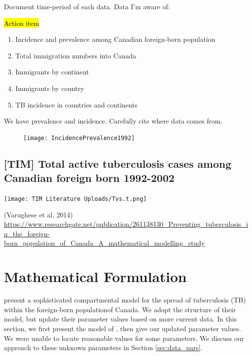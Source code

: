 \documentclass[sn-mathphys,Numbered]{sn-jnl}%
\theoremstyle{thmstyleone}%
\theoremstyle{thmstyletwo}%
\theoremstyle{thmstylethree}%
\begin{document}
Document time-period of each data.  Data I'm aware of:

\hl{Action item}
\begin{enumerate}
    \item Incidence and prevalence among Canadian foreign-born population 
    \item Total immigration numbers into Canada
    \item Immigrants by continent
    \item Immigrants by country
    \item TB incidence in countries and continents
\end{enumerate}

We have prevalence and incidence.  Carefully cite where data comes from.

\begin{figure}
    \texttt{[image: IncidencePrevalence1992]}
\end{figure}



\subsection{[TIM] Total active tuberculosis cases among Canadian foreign born 1992-2002} 

 \texttt{[image: TIM Literature Uploads/Tvs.t.png]}

 (Varughese et al, 2014) \url{https://www.researchgate.net/publication/261138130_Preventing_tuberculosis_in_the_foreign-born_population_of_Canada_A_mathematical_modelling_study}



\section{Mathematical Formulation}

\citet{Guo2011PersistentLatency} present a sophisticated compartmental model for the spread of tuberculosis (TB) within the foreign-born population\footnotemark of Canada. We adopt the structure of their model, but update their parameter values based on more current data. In this section, we first present the model of \citeauthor{Guo2011PersistentLatency}, then give our updated parameter values. We were unable to locate reasonable values for some parameters. We discuss our approach to these unknown parameters in Section \ref{sec:data_pars}.

\end{document}
